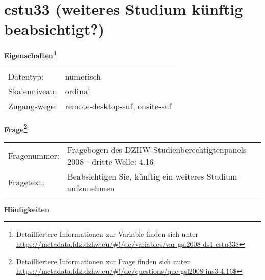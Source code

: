 
    \setcounter{footnote}{0}

    \vspace*{-1.8cm}
	\section{cstu33 (weiteres Studium künftig beabsichtigt?)}
	\label{section:cstu33}



    \vspace*{0.5cm}
    \noindent\textbf{Eigenschaften\footnote{Detailliertere Informationen zur Variable finden sich unter
		\url{https://metadata.fdz.dzhw.eu/\#!/de/variables/var-gsl2008-ds1-cstu33$}}}\\
	\begin{tabularx}{\hsize}{@{}lX}
	Datentyp: & numerisch \\
	Skalenniveau: & ordinal \\
	Zugangswege: &
	  remote-desktop-suf, 
	  onsite-suf
 \\
    \end{tabularx}



				\vspace*{0.5cm}
                \noindent\textbf{Frage\footnote{Detailliertere Informationen zur Frage finden sich unter
		              \url{https://metadata.fdz.dzhw.eu/\#!/de/questions/que-gsl2008-ins3-4.16$}}}\\
				\begin{tabularx}{\hsize}{@{}lX}
					Fragenummer: &
					  Fragebogen des DZHW-Studienberechtigtenpanels 2008 - dritte Welle:
					  4.16
 \\
					Fragetext: & Beabsichtigen Sie, künftig ein weiteres Studium aufzunehmen \\
				\end{tabularx}





        		\vspace*{0.5cm}
                \noindent\textbf{Häufigkeiten}

